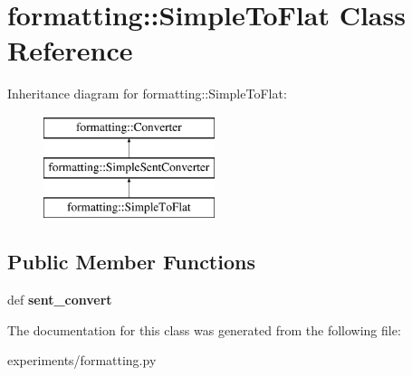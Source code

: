 \hypertarget{classformatting_1_1SimpleToFlat}{
\section{formatting::SimpleToFlat Class Reference}
\label{classformatting_1_1SimpleToFlat}
}
Inheritance diagram for formatting::SimpleToFlat:\begin{figure}[H]
\begin{center}
\leavevmode
\includegraphics[height=3cm]{classformatting_1_1SimpleToFlat}
\end{center}
\end{figure}
\subsection*{Public Member Functions}
\begin{DoxyCompactItemize}
\item 
\hypertarget{classformatting_1_1SimpleToFlat_abf6445704e25b31ff958ddcaa0ff80f6}{
def {\bfseries sent\_\-convert}}
\label{classformatting_1_1SimpleToFlat_abf6445704e25b31ff958ddcaa0ff80f6}

\end{DoxyCompactItemize}


The documentation for this class was generated from the following file:\begin{DoxyCompactItemize}
\item 
experiments/formatting.py\end{DoxyCompactItemize}
